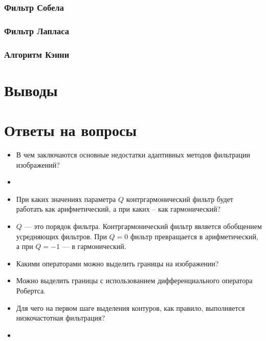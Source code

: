 \subsubsection{Фильтр Собела}
\subsubsection{Фильтр Лапласа}
\subsubsection{Алгоритм Кэнни}
\section{Выводы}

\section{Ответы на вопросы}

\setcounter{question}{0}

\newcommand{\question}[1]{\item[Q\refstepcounter{question}\thequestion.] #1}
\newcommand{\answer}[1]{\item[A\thequestion.] #1}

\begin{itemize}

\question{В чем заключаются основные недостатки адаптивных методов фильтрации изображений?}
\answer{}

\question{При каких значениях параметра $Q$ контргармонический фильтр будет работать как арифметический, а при каких -- как гармонический?}
\answer{$Q$ — это порядок фильтра. Контргармонический фильтр является обобщением усредняющих фильтров. При $Q = 0$ фильтр превращается в арифметический, а при $Q = -1$ — в гармонический.}

\question{Какими операторами можно выделить границы на изображении?}
\answer{Можно выделить границы с использованием дифференциального оператора
Робертса.}

\question{Для чего на первом шаге выделения контуров, как правило, выполняется низкочастотная фильтрация?}
\answer{}

\end{itemize}
